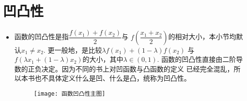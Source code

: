 \section{凹凸性}
\begin{itemize}[leftmargin=\inteval{\myitemleftmargin}pt,itemsep=
   \inteval{\myitemitempsep}pt,topsep=\inteval{\myitemtopsep}pt]
\item 函数的凹凸性是指$ \dfrac{f(x_1)+f(x_2)}{2} $与
$ f(\dfrac{x_1+x_2}{2}) $的相对大小，本小节均默认$ x_1 \neq x_2 $. 
更一般地，是比较$ \lambda f(x_1)+(1-\lambda)f(x_2) $ 
与$ f(\lambda x_1+(1-\lambda)x_2) $的大小，其中$ \lambda \in (0,1) $. 
函数的凹凸性直接由二阶导数的正负决定。因为不同的书上对凹函数与凸函数的定义
已经完全混乱，所以本书也不具体定义什么是凹、什么是凸，统称为凹凸性。
\begin{figure}[H]
    \centering
    \texttt{[image: 函数凹凸性主图]}
\end{figure}


\end{itemize}

